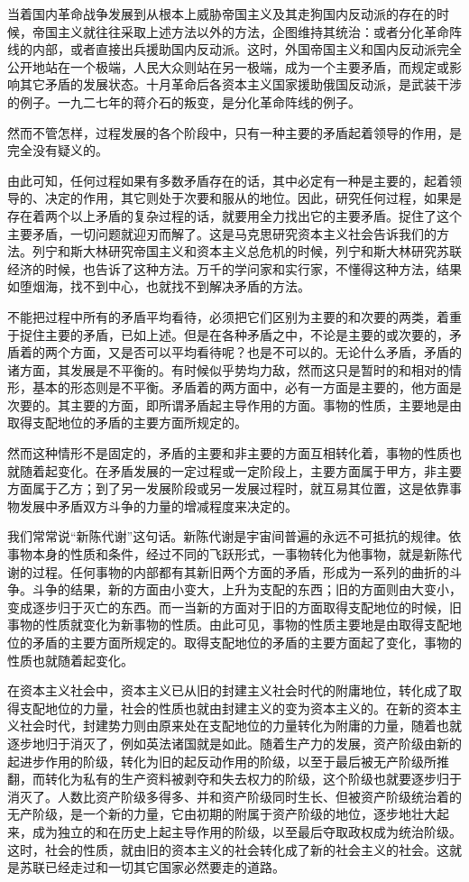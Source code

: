 \documentclass[UTF8, 12pt, a4paper]{ctexrep}
\begin{document}
当着国内革命战争发展到从根本上威胁帝国主义及其走狗国内反动派的存在的时候，帝国主义就往往采取上述方法以外的方法，企图维持其统治：或者分化革命阵线的内部，或者直接出兵援助国内反动派。这时，外国帝国主义和国内反动派完全公开地站在一个极端，人民大众则站在另一极端，成为一个主要矛盾，而规定或影响其它矛盾的发展状态。十月革命后各资本主义国家援助俄国反动派，是武装干涉的例子。一九二七年的蒋介石的叛变，是分化革命阵线的例子。

然而不管怎样，过程发展的各个阶段中，只有一种主要的矛盾起着领导的作用，是完全没有疑义的。

由此可知，任何过程如果有多数矛盾存在的话，其中必定有一种是主要的，起着领导的、决定的作用，其它则处于次要和服从的地位。因此，研究任何过程，如果是存在着两个以上矛盾的复杂过程的话，就要用全力找出它的主要矛盾。捉住了这个主要矛盾，一切问题就迎刃而解了。这是马克思研究资本主义社会告诉我们的方法。列宁和斯大林研究帝国主义和资本主义总危机的时候，列宁和斯大林研究苏联经济的时候，也告诉了这种方法。万千的学问家和实行家，不懂得这种方法，结果如堕烟海，找不到中心，也就找不到解决矛盾的方法。

不能把过程中所有的矛盾平均看待，必须把它们区别为主要的和次要的两类，着重于捉住主要的矛盾，已如上述。但是在各种矛盾之中，不论是主要的或次要的，矛盾着的两个方面，又是否可以平均看待呢？也是不可以的。无论什么矛盾，矛盾的诸方面，其发展是不平衡的。有时候似乎势均力敌，然而这只是暂时的和相对的情形，基本的形态则是不平衡。矛盾着的两方面中，必有一方面是主要的，他方面是次要的。其主要的方面，即所谓矛盾起主导作用的方面。事物的性质，主要地是由取得支配地位的矛盾的主要方面所规定的。

然而这种情形不是固定的，矛盾的主要和非主要的方面互相转化着，事物的性质也就随着起变化。在矛盾发展的一定过程或一定阶段上，主要方面属于甲方，非主要方面属于乙方；到了另一发展阶段或另一发展过程时，就互易其位置，这是依靠事物发展中矛盾双方斗争的力量的增减程度来决定的。

我们常常说“新陈代谢”这句话。新陈代谢是宇宙间普遍的永远不可抵抗的规律。依事物本身的性质和条件，经过不同的飞跃形式，一事物转化为他事物，就是新陈代谢的过程。任何事物的内部都有其新旧两个方面的矛盾，形成为一系列的曲折的斗争。斗争的结果，新的方面由小变大，上升为支配的东西；旧的方面则由大变小，变成逐步归于灭亡的东西。而一当新的方面对于旧的方面取得支配地位的时候，旧事物的性质就变化为新事物的性质。由此可见，事物的性质主要地是由取得支配地位的矛盾的主要方面所规定的。取得支配地位的矛盾的主要方面起了变化，事物的性质也就随着起变化。

在资本主义社会中，资本主义已从旧的封建主义社会时代的附庸地位，转化成了取得支配地位的力量，社会的性质也就由封建主义的变为资本主义的。在新的资本主义社会时代，封建势力则由原来处在支配地位的力量转化为附庸的力量，随着也就逐步地归于消灭了，例如英法诸国就是如此。随着生产力的发展，资产阶级由新的起进步作用的阶级，转化为旧的起反动作用的阶级，以至于最后被无产阶级所推翻，而转化为私有的生产资料被剥夺和失去权力的阶级，这个阶级也就要逐步归于消灭了。人数比资产阶级多得多、并和资产阶级同时生长、但被资产阶级统治着的无产阶级，是一个新的力量，它由初期的附属于资产阶级的地位，逐步地壮大起来，成为独立的和在历史上起主导作用的阶级，以至最后夺取政权成为统治阶级。这时，社会的性质，就由旧的资本主义的社会转化成了新的社会主义的社会。这就是苏联已经走过和一切其它国家必然要走的道路。
\end{document}
